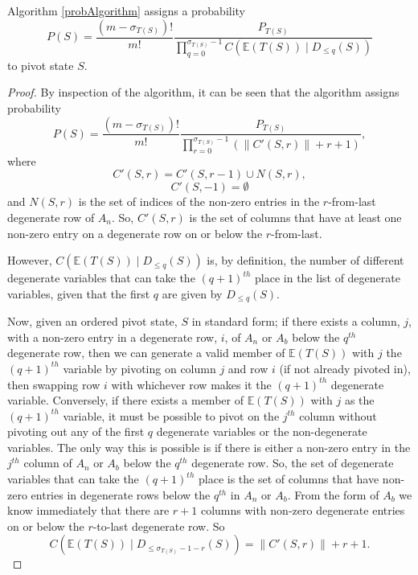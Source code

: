 \begin{theorem}
Algorithm \ref{probAlgorithm} assigns a probability
\[
P(S) =  \frac{(m-\sigma_{T(S)})!}{m!} \frac{P_{T(S)}}{\prod_{q=0}^{\sigma_{T(S)}-1} C(\mathbb{E}(T(S)) \mid D_{\le q}(S))}
\]
to pivot state $S$.
\end{theorem}
\begin{proof}
By inspection of the algorithm, it can be seen that the algorithm assigns probability 
\[
P(S) =  \frac{(m-\sigma_{T(S)})!}{m!} \frac{P_{T(S)}}{\prod_{r=0}^{\sigma_{T(S)}-1} \left(\left\|C'(S, r)\right\| + r + 1\right)},
\]
where
\[
C'(S,r) = C'(S,r-1) \cup N(S,r),
\]
\[
C'(S,-1) = \emptyset
\]
and $N(S,r)$ is the set of indices of the non-zero entries in the $r$-from-last degenerate row of $A_n$. So, $C'(S,r)$ is the set of columns that have at least one non-zero entry on a degenerate row on or below the $r$-from-last.

However, $C(\mathbb{E}(T(S)) \mid D_{\le q}(S))$ is, by definition, the number of different degenerate variables that can take the $(q+1)^{th}$ place in the list of degenerate variables, given that the first $q$ are given by $D_{\le q}(S)$.

Now, given an ordered pivot state, $S$ in standard form; if there exists a column, $j$, with a non-zero entry in a degenerate row, $i$,  of $A_n$ or $A_b$ below the $q^{th}$ degenerate row, then we can generate a valid member of $\mathbb{E}(T(S))$ with $j$ the $(q+1)^{th}$ variable by pivoting on column $j$ and row $i$ (if not already pivoted in), then swapping row $i$ with whichever row makes it the $(q+1)^{th}$ degenerate variable. Conversely, if there exists a member of $\mathbb{E}(T(S))$ with $j$ as the $(q+1)^{th}$ variable, it must be possible to pivot on the $j^{th}$ column without pivoting out any of the first $q$ degenerate variables or the non-degenerate variables. The only way this is possible is if there is either a non-zero entry in the $j^{th}$ column of $A_n$ or $A_b$ below the $q^{th}$ degenerate row. So, the set of degenerate variables that can take the $(q+1)^{th}$ place is the set of columns that have non-zero entries in degenerate rows below the $q^{th}$ in $A_n$ or $A_b$. From the form of $A_b$ we know immediately that there are $r+1$ columns with non-zero degenerate entries on or below the $r$-to-last degenerate row. So
\[
C(\mathbb{E}(T(S)) \mid D_{\le \sigma_{T(S)} -1 - r}(S)) = \left\|C'(S, r)\right\| + r + 1.
\]


\end{proof}

